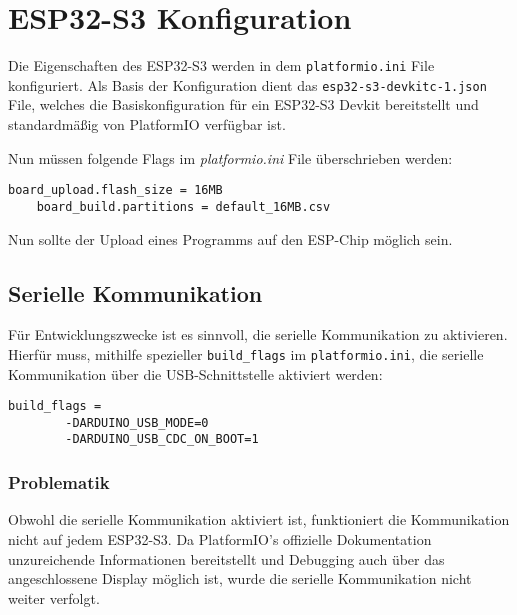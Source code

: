     \section{ESP32-S3 Konfiguration}
    Die Eigenschaften des ESP32-S3 werden in dem \lstinline{platformio.ini}
    File konfiguriert. Als Basis der Konfiguration dient
    das \lstinline{esp32-s3-devkitc-1.json} File, welches die
    Basiskonfiguration für ein ESP32-S3 Devkit bereitstellt
    und standardmäßig von PlatformIO verfügbar ist. \par
    
    Nun müssen folgende Flags im \textit{platformio.ini} File
    überschrieben werden:

    \begin{lstlisting}[style=cppCode]
    board_upload.flash_size = 16MB
    board_build.partitions = default_16MB.csv
    \end{lstlisting}

    Nun sollte der Upload eines Programms auf den 
    ESP-Chip möglich sein.

        \subsection{Serielle Kommunikation}
        Für Entwicklungszwecke ist es sinnvoll, die 
        serielle Kommunikation zu aktivieren. Hierfür
        muss, mithilfe spezieller \texttt{build\_flags}
        im \texttt{platformio.ini}, die serielle Kommunikation über die USB-Schnittstelle
        aktiviert werden:

        \begin{lstlisting}[style=cppCode]
    build_flags =
        -DARDUINO_USB_MODE=0
        -DARDUINO_USB_CDC_ON_BOOT=1
        \end{lstlisting}

            \subsubsection{Problematik}
            Obwohl die serielle Kommunikation aktiviert ist,
            funktioniert die Kommunikation nicht auf jedem
            ESP32-S3. Da PlatformIO's offizielle 
            Dokumentation \cite{PlatformIO_build_flags}
            unzureichende Informationen bereitstellt und
            Debugging auch über das angeschlossene Display
            möglich ist, wurde die serielle Kommunikation
            nicht weiter verfolgt.



    
    




